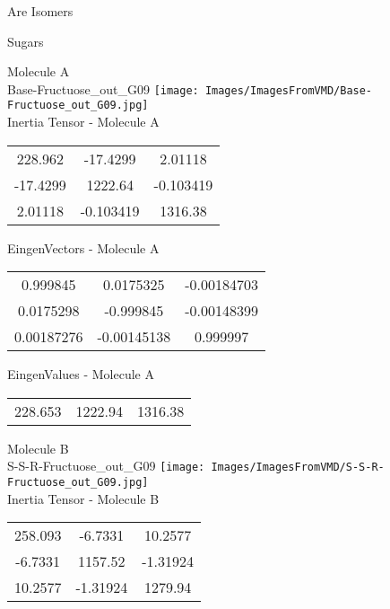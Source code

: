 \begin{center}
\vtab
\vtab
\textcolor{NavyBlue}{\Large Are Isomers}
\end{center}
\newpage

\vtab[-2cm]
\begin{center}
{\large Sugars}
\end{center}
\begin{multicols}{2}
\begin{center}
Molecule A \\ 
Base-Fructuose\_out\_G09
\texttt{[image: Images/ImagesFromVMD/Base-Fructuose\_out\_G09.jpg]}
\\
Inertia Tensor - Molecule A \\
\vtab
\begin{tabular}{|c c c|}
228.962	 & 	-17.4299	 & 	2.01118	 \\
-17.4299	 & 	1222.64	 & 	-0.103419	 \\
2.01118	 & 	-0.103419	 & 	1316.38
\end{tabular}

\vtab
 EingenVectors - Molecule A     \\
\vtab
\begin{tabular}{|c c c|}
0.999845	 & 	0.0175325	 & 	-0.00184703	 \\
0.0175298	 & 	-0.999845	 & 	-0.00148399	 \\
0.00187276	 & 	-0.00145138	 & 	0.999997
\end{tabular}

\vtab
 EingenValues - Molecule A     \\
\vtab
\begin{tabular}{|c c c|}
228.653	 & 	1222.94	 & 	1316.38
\end{tabular}
\columnbreak

Molecule B \\ 
S-S-R-Fructuose\_out\_G09
\texttt{[image: Images/ImagesFromVMD/S-S-R-Fructuose\_out\_G09.jpg]}
\\
Inertia Tensor - Molecule B \\
\vtab
\begin{tabular}{|c c c|}
258.093	 & 	-6.7331	 & 	10.2577	 \\
-6.7331	 & 	1157.52	 & 	-1.31924	 \\
10.2577	 & 	-1.31924	 & 	1279.94
\end{tabular}


\end{center}
\end{multicols}
